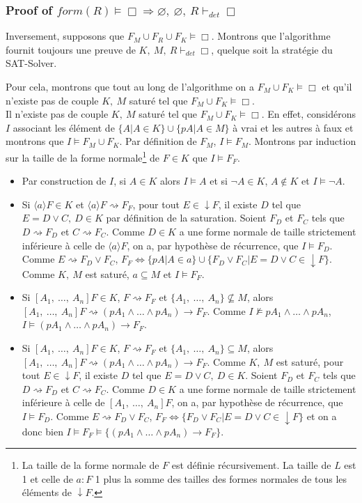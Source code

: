 \documentclass[a4paper,11pt]{article}
\newcommand{\dett}{\vdash_\mathit{det}}
\newcommand{\F}{\mathit{form}}
\begin{document}
\subsubsection*{Proof of $\F(R)\vDash\Box\Rightarrow\varnothing,\ \varnothing,\ R\dett\Box$}
Inversement, supposons que $F_M\cup F_R\cup F_K\vDash\Box$. Montrons que l'algorithme
fournit toujours une preuve de $K,\ M,\ R\dett\Box$, quelque soit la stratégie du SAT-Solver.

Pour cela, montrons que tout au long de l'algorithme on a $F_M\cup F_K\vDash\Box$ et qu'il n'existe pas de couple $K,\ M$ saturé tel que $F_M\cup F_K\vDash\Box$.\\
Il n'existe pas de couple $K,\ M$ saturé tel que $F_M\cup F_K\vDash\Box$. En effet, considérons
$I$ associant les élément de $\{A|A\in K\}\cup\{pA|A\in M\}$ à vrai et les autres à faux
et montrons que $I\vDash F_M\cup F_K$. Par définition de $F_M$, $I\vDash F_M$.
Montrons par induction sur la taille de la forme normale\footnote{La taille de la forme normale de $F$ est
définie récursivement. La taille de $L$ est 1 et celle de $a:F$ 1 plus la somme des tailles des formes normales de
tous les éléments de $\downarrow F$.} de $F\in K$ que $I\vDash F_F$.
\begin{itemize}
 \item Par construction de $I$, si $A\in K$ alors $I\vDash A$ et si $\neg A\in K$,
$A\notin K$ et $I\vDash \neg A$.
 \item Si $\langle a\rangle F\in K$ et $\langle a\rangle F\rightsquigarrow F_F$,
pour tout $E\in\downarrow F$,
il existe $D$ tel que $E=D\vee C,\ D\in K$ par définition de la saturation.
Soient $F_D$ et $F_C$ tels que $D\rightsquigarrow F_D$ et $C\rightsquigarrow F_C$.
Comme $D\in K$ a une forme normale de taille strictement inférieure à celle de $\langle a\rangle F$,
on a, par hypothèse de récurrence, que $I\vDash F_D$. Comme $E\rightsquigarrow F_D\vee F_C$,
$F_F\Leftrightarrow \{pA|A\in a\}\cup\{F_D\vee F_C| E=D\vee C\in\downarrow F\}$.
Comme $K,\ M$ est saturé, $a\subseteq M$ et $I\vDash F_F$. 
 \item Si $[A_1,\ \dots,\ A_n]F\in K$, $F\rightsquigarrow F_F$ et $\{A_1,\ \dots,\ A_n\}\nsubseteq M$, alors
$[A_1,\ \dots,\ A_n]F\rightsquigarrow (pA_1\wedge\dots\wedge pA_n)\rightarrow F_F$.
Comme $I\nvDash pA_1\wedge\dots\wedge pA_n$, $I\vDash(pA_1\wedge\dots\wedge pA_n)\rightarrow F_F$.
 \item Si $[A_1,\ \dots,\ A_n]F\in K$, $F\rightsquigarrow F_F$ et $\{A_1,\ \dots,\ A_n\}\subseteq M$, alors
$[A_1,\ \dots,\ A_n]F\rightsquigarrow (pA_1\wedge\dots\wedge pA_n)\rightarrow F_F$. 
Comme $K,\ M$ est saturé, pour tout $E\in\downarrow F$, il existe $D$ tel que $E=D\vee C,\ D\in K$.
Soient $F_D$ et $F_C$ tels que $D\rightsquigarrow F_D$ et $C\rightsquigarrow F_C$.
Comme $D\in K$ a une forme normale de taille strictement inférieure à celle de $[A_1,\ \dots,\ A_n]F$,
on a, par hypothèse de récurrence, que $I\vDash F_D$. Comme $E\rightsquigarrow F_D\vee F_C$,
$F_F\Leftrightarrow \{F_D\vee F_C|E=D\vee C\in\downarrow F\}$ et on a donc 
bien $I\vDash F_F\vDash \{(pA_1\wedge\dots\wedge pA_n)\rightarrow F_F\}$.
\end{itemize}
\end{document}
